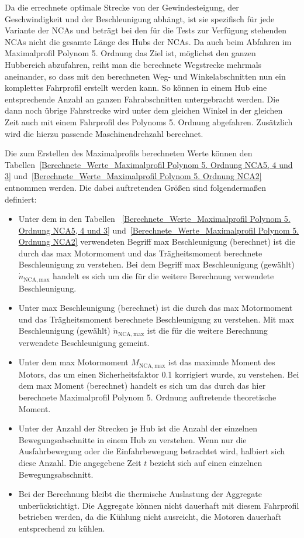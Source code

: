 Da die errechnete optimale Strecke von der Gewindesteigung, der Geschwindigkeit und der Beschleunigung abhängt, ist sie spezifisch für jede Variante der NCAs und beträgt bei den für die Tests zur Verfügung stehenden NCAs nicht die gesamte Länge des Hubs der NCAs. Da auch beim Abfahren im Maximalprofil Polynom 5. Ordnung das Ziel ist, möglichst den ganzen Hubbereich abzufahren, reiht man die  berechnete Wegstrecke mehrmals  aneinander, so dass mit den berechneten Weg- und Winkelabschnitten  nun ein komplettes Fahrprofil erstellt werden kann. So können in einem Hub eine entsprechende Anzahl an ganzen Fahrabschnitten untergebracht werden. Die dann noch übrige Fahrstrecke wird unter dem gleichen Winkel in der gleichen Zeit auch mit einem Fahrprofil des Polynoms 5. Ordnung abgefahren. Zusätzlich wird die hierzu passende Maschinendrehzahl berechnet.

Die zum Erstellen des Maximalprofils berechneten Werte können den Tabellen~\ref{Berechnete_Werte_Maximalprofil Polynom 5. Ordnung NCA5, 4 und 3}  und~\ref{Berechnete_Werte_Maximalprofil Polynom 5. Ordnung NCA2}  entnommen werden. Die dabei auftretenden Größen sind folgendermaßen definiert:


\begin{itemize}
    \item Unter dem in den Tabellen ~\ref{Berechnete_Werte_Maximalprofil Polynom 5. Ordnung NCA5, 4 und 3}  und~\ref{Berechnete_Werte_Maximalprofil Polynom 5. Ordnung NCA2} verwendeten Begriff max Beschleunigung (berechnet) ist die durch das max Motormoment und das Trägheitsmoment berechnete Beschleunigung zu verstehen. Bei dem Begriff max Beschleunigung (gewählt) $\dot{n}_{\mathrm{NCA, max}}$ handelt es sich um die für die weitere Berechnung verwendete Beschleunigung.
    
    \item Unter max Beschleunigung (berechnet) ist die durch das max Motormoment und das Trägheitsmoment berechnete Beschleunigung zu verstehen. Mit max Beschleunigung (gewählt) $\dot{n}_{\mathrm{NCA, max}}$ ist die für die weitere Berechnung verwendete Beschleunigung gemeint.
    
    \item Unter dem max Motormoment $M_{\mathrm{NCA, max}}$ ist das maximale Moment des Motors, das um einen Sicherheitsfaktor \SI{0.1}{} korrigiert wurde, zu verstehen. Bei dem  max Moment (berechnet) handelt es sich um das durch das hier berechnete Maximalprofil Polynom 5. Ordnung auftretende theoretische Moment.
    
    \item Unter der Anzahl der Strecken je Hub ist die Anzahl der einzelnen Bewegungsabschnitte in einem Hub zu verstehen. Wenn nur die Ausfahrbewegung oder die Einfahrbewegung betrachtet wird, halbiert sich diese Anzahl. Die angegebene Zeit $t$ bezieht sich auf einen einzelnen Bewegungsabschnitt.
    
    \item Bei der Berechnung bleibt die thermische Auslastung der Aggregate  unberücksichtigt. Die Aggregate können nicht dauerhaft mit diesem Fahrprofil betrieben werden, da die Kühlung nicht ausreicht, die Motoren dauerhaft entsprechend zu kühlen.
\end{itemize}


